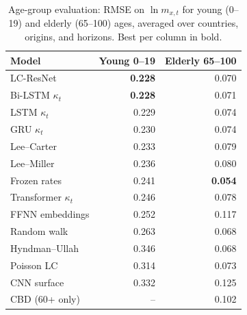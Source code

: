 \documentclass[11pt,a4paper]{article}
\begin{document}
\begin{table}[htbp]
\centering
\caption{Age-group evaluation: RMSE on $\ln m_{x,t}$ for young (0--19) and elderly (65--100) ages, averaged over countries, origins, and horizons. Best per column in bold.}
\label{tab:agegroups}
\small
\begin{tabular}{l RR}
\toprule
Model & Young 0--19 & Elderly 65--100 \\
\midrule
LC-ResNet          & \textbf{0.228} & 0.070 \\
Bi-LSTM $\kappa_t$ & \textbf{0.228} & 0.071 \\
LSTM $\kappa_t$    & 0.229 & 0.074 \\
GRU $\kappa_t$     & 0.230 & 0.074 \\
Lee--Carter        & 0.233 & 0.079 \\
Lee--Miller        & 0.236 & 0.080 \\
Frozen rates       & 0.241 & \textbf{0.054} \\
Transformer $\kappa_t$ & 0.246 & 0.078 \\
FFNN embeddings    & 0.252 & 0.117 \\
Random walk        & 0.263 & 0.068 \\
Hyndman--Ullah     & 0.346 & 0.068 \\
Poisson LC         & 0.314 & 0.073 \\
CNN surface        & 0.332 & 0.125 \\
CBD (60+ only)     & --    & 0.102 \\
\bottomrule
\end{tabular}
\end{table}
\end{document}
